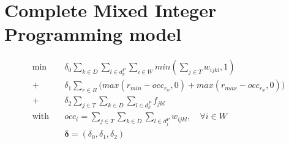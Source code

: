 \documentclass[../../thesis.tex]{subfiles}
\begin{document}
\chapter{Complete Mixed Integer Programming model}

\begingroup
\allowdisplaybreaks
\begin{subequations}
  \begin{align*}
    \textrm{min} \quad & \delta_0 \sum_{k \in D} \sum_{l \in d^P_k} \sum_{i \in W} min(\sum_{j \in T} w_{ijkl}, 1)  \\ 
      + \ & \delta_1 \sum_{r \in R} \big( max(r_{min} - occ_{r_{w}}, 0) + max(r_{max} - occ_{r_{w}}, 0) \big)   \\ 
      + \ &\delta_2 \sum_{j \in T}\sum_{k\in D}\sum_{l \in d^P_k} f_{jkl}  \\ 
     \textrm{with} \quad & occ_i = \sum_{j \in T} \sum_{k \in D} \sum_{l \in d^P_j} w_{ijkl}, \quad \forall i \in W  \nonumber \\ 
                         & \bm{\delta} = (\delta_0, \delta_1, \delta_2) \nonumber
  \end{align*}
\end{subequations}
\end{document}
